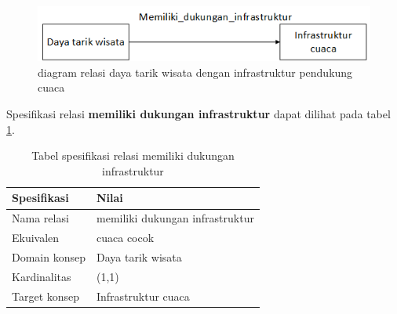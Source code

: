 \begin{figure}[h!]
    \centering
    \includegraphics[scale=0.7]{img/rel-diagram.png}
    \caption{diagram relasi daya tarik wisata dengan infrastruktur pendukung cuaca}
    \label{fig:reldiagram}
\end{figure}

Spesifikasi relasi \textbf{memiliki dukungan infrastruktur} dapat dilihat pada tabel \ref{table:hasinssupport}.
\begin{table}[h]
\begin{center}
\begin{tabular}{ |l|m{8cm}| } 
\hline
	\textbf{Spesifikasi} & \textbf{Nilai}\\
	\hline
	Nama relasi & memiliki dukungan infrastruktur\\
	\hline
	Ekuivalen & cuaca cocok\\
	\hline
	Domain konsep & Daya tarik wisata\\
	\hline
	Kardinalitas & (1,1)\\
	\hline
	Target konsep & Infrastruktur cuaca\\
	\hline
\end{tabular}
\end{center}
\caption{Tabel spesifikasi relasi memiliki dukungan infrastruktur}
\label{table:hasinssupport}
\end{table}

